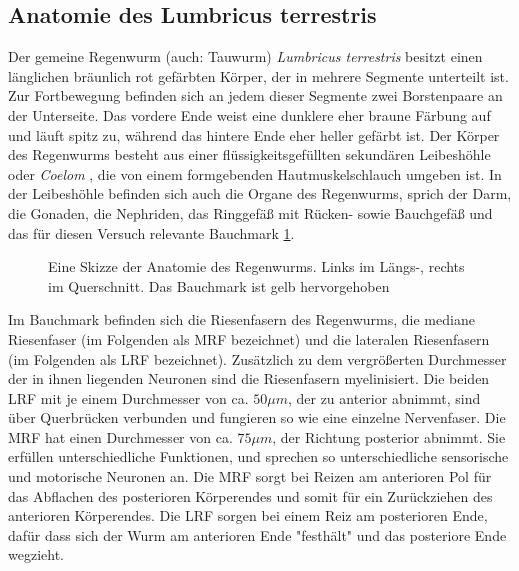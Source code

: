 \documentclass[11pt]{article}
\begin{document}
\subsection{Anatomie des Lumbricus terrestris}
Der gemeine Regenwurm (auch: Tauwurm) \textit{Lumbricus terrestris} besitzt einen länglichen bräunlich rot gefärbten Körper, der in mehrere Segmente unterteilt ist. Zur Fortbewegung befinden sich an jedem dieser Segmente zwei Borstenpaare an der Unterseite. Das vordere Ende weist eine dunklere eher braune Färbung auf und läuft spitz zu, während das hintere Ende eher heller gefärbt ist. Der Körper des Regenwurms besteht aus einer flüssigkeitsgefüllten sekundären Leibeshöhle oder \textit{Coelom} , die von einem formgebenden Hautmuskelschlauch umgeben ist. In der Leibeshöhle befinden sich auch die Organe des Regenwurms, sprich der Darm, die Gonaden, die Nephriden, das Ringgefäß mit Rücken- sowie Bauchgefäß und das für diesen Versuch relevante Bauchmark \ref{bauchmark}. 
\begin{figure}[H]
\caption{Eine Skizze der Anatomie des Regenwurms. Links im Längs-, rechts im Querschnitt. Das Bauchmark ist gelb hervorgehoben}
\label{bauchmark}
\end{figure}
Im Bauchmark befinden sich die Riesenfasern des Regenwurms, die mediane Riesenfaser (im Folgenden als MRF bezeichnet) und die lateralen Riesenfasern (im Folgenden als LRF bezeichnet). Zusätzlich zu dem vergrößerten Durchmesser der in ihnen liegenden Neuronen sind die Riesenfasern myelinisiert. Die beiden LRF mit je einem Durchmesser von ca. $50 \mu m$, der zu anterior abnimmt, sind über Querbrücken verbunden und fungieren so wie eine einzelne Nervenfaser. Die MRF hat einen Durchmesser von ca. $75 \mu m$, der Richtung posterior abnimmt. Sie erfüllen unterschiedliche Funktionen, und sprechen so unterschiedliche sensorische und motorische Neuronen an. Die MRF sorgt bei Reizen am anterioren Pol für das Abflachen des posterioren Körperendes und somit für ein Zurückziehen des anterioren Körperendes. Die LRF sorgen bei einem Reiz am posterioren Ende, dafür dass sich der Wurm am anterioren Ende "{}festhält"{} und das posteriore Ende wegzieht.\cite{skript}
\end{document}
